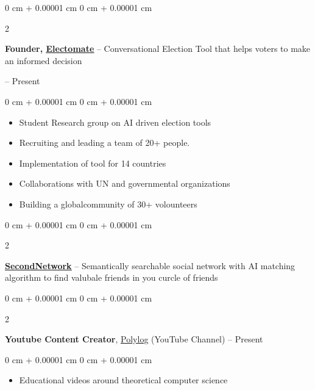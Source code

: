 \documentclass[10pt, letterpaper]{article}
\newenvironment{highlights}{
    \begin{itemize}[
        topsep=0.10 cm,
        parsep=0.10 cm,
        partopsep=0pt,
        itemsep=0pt,
        leftmargin=0 cm + 10pt
    ]
}{
    \end{itemize}
} %
\newenvironment{onecolentry}{
    \begin{adjustwidth}{
        0 cm + 0.00001 cm
    }{
        0 cm + 0.00001 cm
    }
}{
    \end{adjustwidth}
} %
\newenvironment{twocolentry}[2][]{
    \onecolentry
    \def\secondColumn{#2}
    \setcolumnwidth{\fill, 4.5 cm}
    \begin{paracol}{2}
}{
    \switchcolumn \raggedleft \secondColumn
    \end{paracol}
    \endonecolentry
} %
\begin{document}
        \vspace{0.2 cm}

        \begin{twocolentry}
        {        2024 – Present}
            \textbf{Founder, \href{https://elect-o-mate.eu/}{\underline{Electomate}}} – Conversational Election Tool that helps voters to make an informed decision
        \end{twocolentry}
        

        \vspace{0.10 cm}
        \begin{onecolentry}
            \begin{highlights}
                \item Student Research group on AI driven election tools
                \item Recruiting and leading a team of 20+ people.
                \item Implementation of tool for 14 countries
                \item Collaborations with UN and governmental organizations
                \item Building a globalcommunity of 30+ volounteers
            \end{highlights}
        \end{onecolentry}


\vspace{0.2cm}

 \begin{twocolentry}
        {        2024}
            \href{https://gabors.net/}{\textbf{\underline{SecondNetwork}}} – Semantically searchable social network with AI matching algorithm to find valubale friends in you curcle of friends
        \end{twocolentry}




                \vspace{0.2 cm}
\begin{twocolentry}{
            2024 – Present
        }
            \textbf{Youtube Content Creator}, \href{https://www.youtube.com/@PolylogCS}{\underline{Polylog}} (YouTube Channel)\end{twocolentry}

        \vspace{0.10 cm}
        \begin{onecolentry}
            \begin{highlights}
                \item Educational videos around theoretical computer science
            \end{highlights}
        \end{onecolentry}
\end{document}
